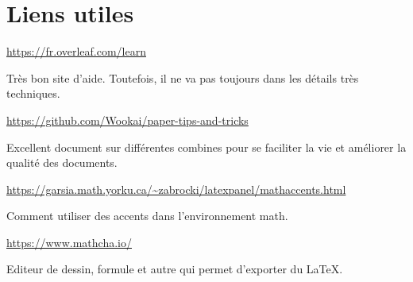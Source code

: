 \section{Liens utiles}
\url{https://fr.overleaf.com/learn}

Très bon site d'aide.
Toutefois, il ne va pas toujours dans les détails très techniques.

\url{https://github.com/Wookai/paper-tips-and-tricks}

Excellent document sur différentes combines pour se faciliter la vie et améliorer la qualité des documents.

\url{https://garsia.math.yorku.ca/~zabrocki/latexpanel/mathaccents.html}

Comment utiliser des accents dans l'environnement math.

\url{https://www.mathcha.io/}

Editeur de dessin, formule et autre qui permet d'exporter du \LaTeX.